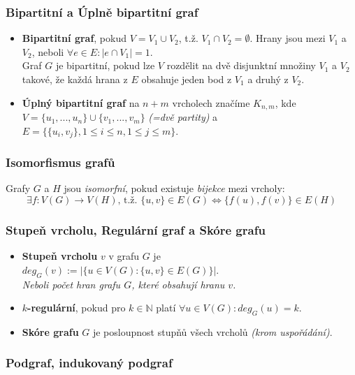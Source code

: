 \documentclass[10pt,a4paper]{article}
\begin{document}
\subsubsection{Bipartitní a Úplně bipartitní graf}
\begin{itemize}
    \item \textbf{Bipartitní graf}, pokud $V = V_1 \cup V_2$, t.ž. $V_1 \cap V_2 = \emptyset$. Hrany jsou mezi $V_1$ a $V_2$, neboli $\forall e \in E: |e\cap V_1| = 1$.\\ 
    Graf $G$ je bipartitní, pokud lze $V$ rozdělit na dvě disjunktní množiny $V_1$ a $V_2$ takové, že každá hrana z $E$ obsahuje jeden bod z $V_1$ a druhý z $V_2$.
    \item \textbf{Úplný bipartitní graf} na $n + m$ vrcholech značíme $K_{n,m}$, kde $V = \{u_1, ..., u_n\} \cup \{v_1, ..., v_m\}$ \textit{(=dvě partity)} a $E = \{\{u_i, v_j\}, 1\leq i\leq n, 1 \leq j \leq m\}$.
\end{itemize}

\subsubsection{Isomorfismus grafů}
Grafy $G$ a $H$ jsou \textit{isomorfní}, pokud existuje \textit{bijekce} mezi vrcholy:
\[\exists f:V(G)\to V(H)\text{, t.ž. }\{u, v\} \in E(G) \iff \{f(u), f(v)\}\in E(H)\]

\subsubsection{Stupeň vrcholu, Regulární graf a Skóre grafu}
\begin{itemize}
    \item \textbf{Stupeň vrcholu} $v$ v grafu $G$ je $deg_G(v) := |\{u \in V(G): \{u, v\} \in E(G)\}|$.\\ \textit{Neboli počet hran grafu $G$, které obsahují hranu $v$.}
    \item \textbf{$k$-regulární}, pokud pro $k \in \mathbb{N}$ platí $\forall u \in V(G) : deg_G(u) = k$.
    \item \textbf{Skóre grafu} $G$ je posloupnost stupňů všech vrcholů \textit{(krom uspořádání)}.
\end{itemize}

\subsubsection{Podgraf, indukovaný podgraf}
\end{document}
